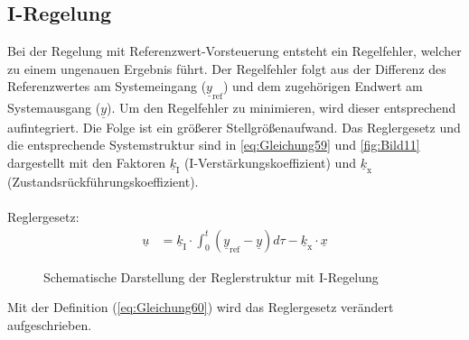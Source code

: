 \documentclass[
	pagesize,
	fontsize=12pt,
	paper=a4,
	oneside,
   reqno
]{scrartcl}
\begin{document}
\subsection{I-Regelung}
Bei der Regelung mit Referenzwert-Vorsteuerung entsteht ein Regelfehler, welcher zu einem ungenauen Ergebnis führt. Der Regelfehler folgt aus der Differenz des Referenzwertes am Systemeingang ($\underline{y}_{\mathrm{ref}}$) und dem zugehörigen Endwert am Systemausgang ($\underline{y}$). Um den Regelfehler zu minimieren, wird dieser entsprechend aufintegriert. Die Folge ist ein größerer Stellgrößenaufwand. Das Reglergesetz und die entsprechende Systemstruktur sind in \autoref{eq:Gleichung59} und \autoref{fig:Bild11} dargestellt mit den Faktoren $\underline{k}_{\mathrm{I}}$ (I-Verstärkungskoeffizient) und $\underline{k}_{\mathrm{x}}$ (Zustandsrückführungskoeffizient).\\\\
Reglergesetz:
\begin{align}\label{eq:Gleichung59}
    \underline{u} &= \underline{k}_{\mathrm{I}}\cdot\int_{0}^t(\underline{y}_{\mathrm{ref}}-\underline{y})d\tau-\underline{k}_{\mathrm{x}}\cdot\underline{x}
\end{align}
\begin{figure}[H]
    \centering
    \caption[Reglerstruktur I-Regelung]{Schematische Darstellung der Reglerstruktur mit I-Regelung}
    \label{fig:Bild11}
\end{figure}
Mit der Definition (\autoref{eq:Gleichung60}) wird das Reglergesetz verändert aufgeschrieben.\\\\
\end{document}
